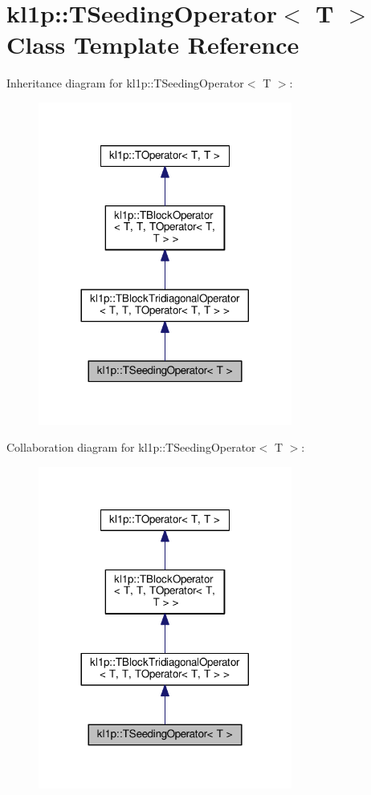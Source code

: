 \hypertarget{classkl1p_1_1TSeedingOperator}{}\section{kl1p\+:\+:T\+Seeding\+Operator$<$ T $>$ Class Template Reference}
\label{classkl1p_1_1TSeedingOperator}


Inheritance diagram for kl1p\+:\+:T\+Seeding\+Operator$<$ T $>$\+:
\nopagebreak
\begin{figure}[H]
\begin{center}
\leavevmode
\includegraphics[width=236pt]{classkl1p_1_1TSeedingOperator__inherit__graph}
\end{center}
\end{figure}


Collaboration diagram for kl1p\+:\+:T\+Seeding\+Operator$<$ T $>$\+:
\nopagebreak
\begin{figure}[H]
\begin{center}
\leavevmode
\includegraphics[width=236pt]{classkl1p_1_1TSeedingOperator__coll__graph}
\end{center}
\end{figure}
